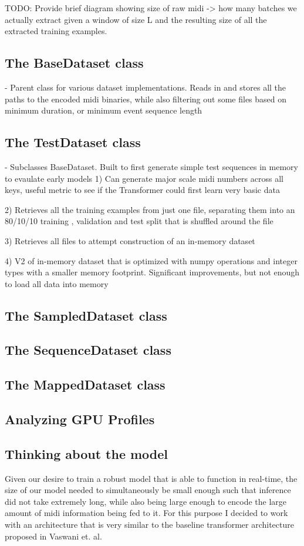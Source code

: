 \documentclass[../main.tex]{subfiles}
\begin{document}
TODO: Provide brief diagram showing size of raw midi -> how many batches we actually extract given a window of size L and the resulting size of all the extracted training examples.

\subsection{The BaseDataset class}
- Parent class for various dataset implementations. Reads in and stores all the paths to the encoded midi binaries, while also filtering out some files based on minimum duration, or minimum event sequence length

\subsection{The TestDataset class}
- Subclasses BaseDataset. Built to first generate simple test sequences in memory to evaulate early models
1) Can generate major scale midi numbers across all keys, useful metric to see if the Transformer could first learn very basic data

2) Retrieves all the training examples from just one file, separating them into an 80/10/10 training , validation and test split that is shuffled around the file

3) Retrieves all files to attempt construction of an in-memory dataset

4) V2 of in-memory dataset that is optimized with numpy operations and integer types with a smaller memory footprint. Significant improvements, but not enough to load all data into memory

\subsection{The SampledDataset class}

\subsection{The SequenceDataset class}

\subsection{The MappedDataset class}

\subsection{Analyzing GPU Profiles}


\subsection{Thinking about the model}
Given our desire to train a robust model that is able to function in real-time, the size of our model needed to simultaneously be small enough such that inference did not take extremely long, while also being large enough to encode the large amount of midi information being fed to it. For this purpose I decided to work with an architecture that is very similar to the baseline transformer architecture proposed in Vaswani et. al\cite{Vaswani:1}.
\end{document}
